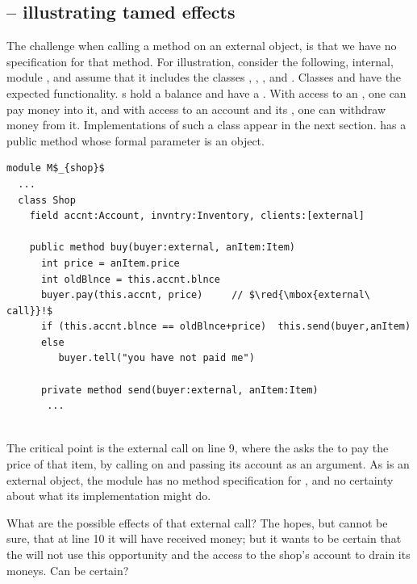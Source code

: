 

\subsection{ -- illustrating tamed effects} %
\label{sec:how}
\label{sec:shop}

The challenge when calling a method on an external object, is that we have no specification for that method. 
 For illustration, consider the following, internal, module \Mshop, and assume that it includes the classes , , , and . 
Classes  { and  have the expected functionality. 
s hold a balance and have a \password. 
With access to an , %
one  can pay money into it, 
and with access to an account  and its \password, one can withdraw money from it.
Implementations of such a class  appear in the next section.
}
   has  a public method  whose formal parameter  is an    object. 

\begin{lstlisting}[mathescape=true, language=Chainmail, frame=lines]
module M$_{shop}$
  ...   
  class Shop
    field accnt:Account, invntry:Inventory, clients:[external]    
  
    public method buy(buyer:external, anItem:Item)
      int price = anItem.price
      int oldBlnce = this.accnt.blnce
      buyer.pay(this.accnt, price)     // $\red{\mbox{external\ call}}!$
      if (this.accnt.blnce == oldBlnce+price)  this.send(buyer,anItem)
      else
         buyer.tell("you have not paid me") 
     
      private method send(buyer:external, anItem:Item)  
       ... 
        
\end{lstlisting}
 

The critical point is the external call on line 9,   {where the  asks the  to pay the price of that item,
by calling   on  and passing its account as an argument.
As  is an external object, the module \Mshop has no method specification for , and no 
certainty about what its implementation %
might do. 
}

{What are the possible effects of that external call?}
{The  hopes, but cannot be sure, that at line 10  it  will have received money; but 
it wants to be certain  that   the  will not use this opportunity and the access to the 
shop's account  to drain its moneys.
Can   be certain?}

